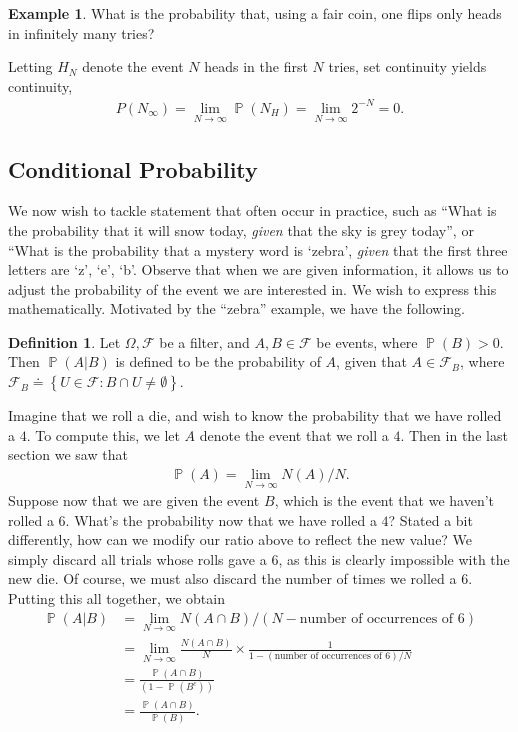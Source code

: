 \documentclass[12pt]{article}
\newcommand{\filter}{\mathcal{F}}
\DeclareMathOperator{\prob}{\mathbb{P}}
\theoremstyle{plain}
\theoremstyle{definition}
\newtheorem*{definition}{Definition}
\newtheorem*{example}{Example}
\theoremstyle{remark}
\numberwithin{equation}{section}  %
\begin{document}
\begin{example}What is the probability that, using a fair coin, one
	flips only heads in infinitely many tries? 
\end{example}
Letting $H_N$ denote the event
$N$ heads in the first $N$ tries, set continuity yields
continuity,
\begin{align*}
	P(N_\infty) = \lim_{N \to \infty} \prob(N_H) = \lim_{N \to \infty} 2^{-N} = 
	0.
\end{align*}
\subsection{Conditional Probability}
We now wish to tackle statement that often occur in practice,
such as ``What is the probability that it will snow today, \emph{given}
that the sky is grey today'', or ``What is the probability that a mystery word
is `zebra', \emph{given} that the first three letters are
`z', `e', `b'.
Observe that when we are given information, it allows us to adjust the
probability of the event we are interested in. We wish to express this
mathematically. Motivated by the ``zebra'' example, we have the following.
\begin{definition}
	Let $\Omega, \filter$ be a filter, and $A, B \in \filter$ be events, where
	$\prob(B) > 0$. Then $\prob(A | B)$ is defined to be the probability of 
	$A$, given that $A \in \filter_B$, where $\filter_B
	\doteq \left\{ U \in \filter: B \cap U \neq \emptyset \right\}$.
\end{definition}
Imagine that we roll a die, and wish to know the probability that
we have rolled a $4$.
To compute this, we let $A$ denote the event that we roll a $4$. Then in the 
last section we saw
that
\begin{align*}
	\prob(A) = \lim_{N \to \infty} N(A)/N.
\end{align*}
Suppose now that we are given the event $B$, which is the event that we haven't
rolled a $6$.
What's the probability now that we have rolled a $4$?
Stated a bit differently, how can we modify our ratio above to reflect the
new value? We simply discard all trials whose rolls gave a $6$, as this is 
clearly
impossible with the new die. Of course, we must also discard the number of times
we rolled a $6$. Putting this all together, we obtain
\begin{align*}
	\prob(A | B) & = \lim_{N \to \infty} N(A \cap B)/(N -
	\text{number of occurrences of $6$})
	\\
	& = \lim_{N \to \infty} \frac{N(A \cap B)}{N}
	\times \frac{1}{1 - (\text{number of occurrences of $6$})/N}
	\\
	& = \frac{\prob(A \cap B)}{(1 - \prob(B^c))}
	\\
	& = \frac{\prob(A \cap B)}{\prob(B)}.
\end{align*}
\end{document}
